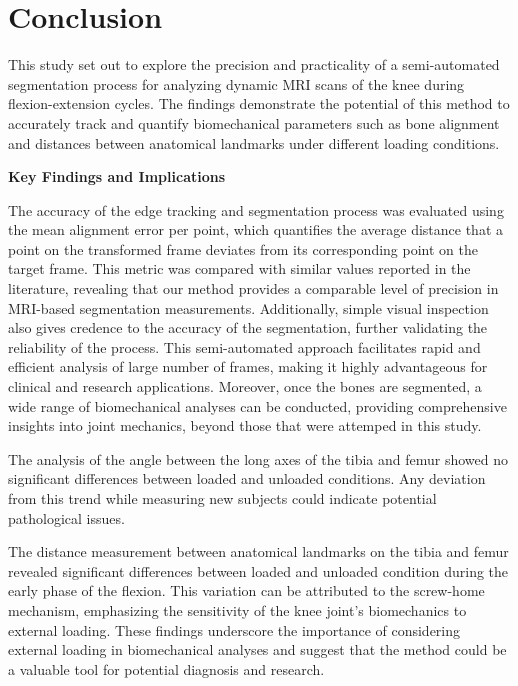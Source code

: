 \documentclass{micro-econ-thesis}
\begin{document}
\section{Conclusion}

This study set out to explore the precision and practicality of a semi-automated segmentation process for analyzing dynamic MRI scans of the knee during flexion-extension cycles. The findings demonstrate the potential of this method to accurately track and quantify biomechanical parameters such as bone alignment and distances between anatomical landmarks under different loading conditions.

\textbf{Key Findings and Implications}

The accuracy of the edge tracking and segmentation process was evaluated using the mean alignment error per point, which quantifies the average distance that a point on the transformed frame deviates from its corresponding point on the target frame. This metric was compared with similar values reported in the literature, revealing that our method provides a comparable level of precision in MRI-based segmentation measurements. Additionally, simple visual inspection also gives credence to the accuracy of the segmentation, further validating the reliability of the process. This semi-automated approach facilitates rapid and efficient analysis of large number of frames, making it highly advantageous for clinical and research applications. Moreover, once the bones are segmented, a wide range of biomechanical analyses can be conducted, providing comprehensive insights into joint mechanics, beyond those that were attemped in this study. 

The analysis of the angle between the long axes of the tibia and femur showed no significant differences between loaded and unloaded conditions. Any deviation from this trend while measuring new subjects could indicate potential pathological issues.

The distance measurement between anatomical landmarks on the tibia and femur revealed significant differences between loaded and unloaded condition during the early phase of the flexion. This variation can be attributed to the screw-home mechanism, emphasizing the sensitivity of the knee joint's biomechanics to external loading. These findings underscore the importance of considering external loading in biomechanical analyses and suggest that the method could be a valuable tool for potential diagnosis and research.
\end{document}
